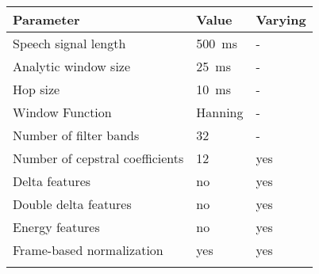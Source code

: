 \begin{table}[ht!]
\scriptsize
\begin{center}
\begin{tabular}{ M{4cm}  M{1.5cm} M{1.5cm}}
\toprule
\textbf{Parameter} & \textbf{Value} & \textbf{Varying} \\
\midrule
Speech signal length & \SI{500}{\milli\second} & - \\
Analytic window size & \SI{25}{\milli\second} & -\\
Hop size & \SI{10}{\milli\second} & -\\
Window Function & Hanning & -\\
\midrule
Number of filter bands & 32 & -\\
Number of cepstral coefficients & 12 & yes\\
Delta features & no & yes \\
Double delta features & no & yes \\
Energy features & no 	& yes \\
Frame-based normalization & yes & yes\\
\bottomrule
\label{tab:exp_details_params_feature}
\end{tabular}
\end{center}
\end{table}